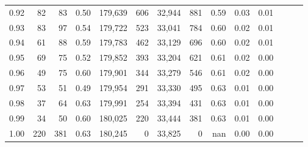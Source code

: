 \begin{tabular}{rrrrrrrrrrrrrr}
0.92 &     82 &   83 &  0.50 &  179,639 &      606 &  32,944 &     881 &  0.59 &  0.03 &      0.01 \\
0.93 &     83 &   97 &  0.54 &  179,722 &      523 &  33,041 &     784 &  0.60 &  0.02 &      0.01 \\
0.94 &     61 &   88 &  0.59 &  179,783 &      462 &  33,129 &     696 &  0.60 &  0.02 &      0.01 \\
0.95 &     69 &   75 &  0.52 &  179,852 &      393 &  33,204 &     621 &  0.61 &  0.02 &      0.00 \\
0.96 &     49 &   75 &  0.60 &  179,901 &      344 &  33,279 &     546 &  0.61 &  0.02 &      0.00 \\
0.97 &     53 &   51 &  0.49 &  179,954 &      291 &  33,330 &     495 &  0.63 &  0.01 &      0.00 \\
0.98 &     37 &   64 &  0.63 &  179,991 &      254 &  33,394 &     431 &  0.63 &  0.01 &      0.00 \\
0.99 &     34 &   50 &  0.60 &  180,025 &      220 &  33,444 &     381 &  0.63 &  0.01 &      0.00 \\
1.00 &    220 &  381 &  0.63 &  180,245 &        0 &  33,825 &       0 &   nan &  0.00 &      0.00 \\
\bottomrule
\end{tabular}
